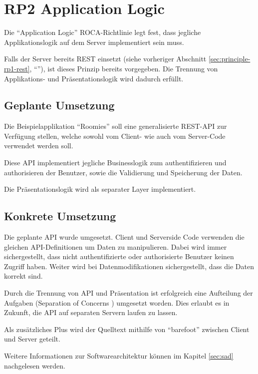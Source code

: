 \section{RP2 Application Logic}
\label{sec:principle-rp2-application-logic}

Die ``Application Logic'' ROCA-Richtlinie legt fest, dass jegliche Applikationslogik auf dem Server implementiert sein muss.

Falls der Server bereits \gls{REST} einsetzt (siehe vorheriger Abschnitt \ref{sec:principle-rp1-rest}, ``''), ist dieses Prinzip bereits vorgegeben. Die Trennung von Applikations- und Präsentationslogik wird dadurch erfüllt.

\subsection*{Geplante Umsetzung}

Die Beispielapplikation ``Roomies'' soll eine generalisierte REST-API zur Verfügung stellen, welche sowohl vom Client- wie auch vom Server-Code verwendet werden soll.

Diese API implementiert jegliche Businesslogik zum authentifizieren und authorisieren der Benutzer, sowie die Validierung und Speicherung der Daten.

Die Präsentationslogik wird als separater Layer implementiert.

\subsection*{Konkrete Umsetzung}
Die geplante API wurde umgesetzt. Client und Serverside Code verwenden die gleichen API-Definitionen um Daten zu manipulieren. Dabei wird immer sichergestellt, dass nicht authentifizierte oder authorisierte Benutzer keinen Zugriff haben.
Weiter wird bei Datenmodifikationen sichergestellt, dass die Daten korrekt sind.

Durch die Trennung von API und Präsentation ist erfolgreich eine Aufteilung der Aufgaben (Separation of Concerns \cite{SeparationOfConcerns}) umgesetzt worden. Dies erlaubt es in Zukunft, die API auf separaten Servern laufen zu lassen.

Als zusätzliches Plus wird der Quelltext mithilfe von ``barefoot'' zwischen Client und Server geteilt.

Weitere Informationen zur Softwarearchitektur können im Kapitel \ref{sec:sad}  nachgelesen werden.

